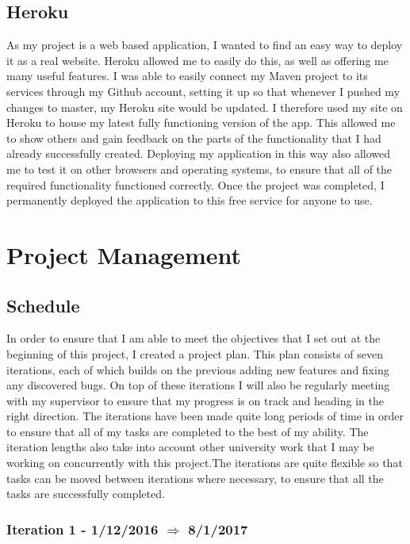 \subsection{Heroku\label{heroku}}
As my project is a web based application, I wanted to find an easy way to deploy it as a real website. Heroku allowed me to easily do this, as well as offering me many useful features. I was able to easily connect my Maven project to its services through my Github account, setting it up so that whenever I pushed my changes to master, my Heroku site would be updated. I therefore used my site on Heroku to house my latest fully functioning version of the app. This allowed me to show others and gain feedback on the parts of the functionality that I had already successfully created. Deploying my application in this way also allowed me to test it on other browsers and operating systems, to ensure that all of the required functionality functioned correctly. Once the project was completed, I permanently deployed the application to this free service for anyone to use.

\pagebreak

\section{Project Management}

\subsection{Schedule \label{schedule}}

In order to ensure that I am able to meet the objectives that I set out at the beginning of this project, I created a project plan. This plan consists of seven iterations, each of which builds on the previous adding new features and fixing any discovered bugs. On top of these iterations I will also be regularly meeting with my supervisor to ensure that my progress is on track and heading in the right direction. The iterations have been made quite long periods of time in order to ensure that all of my tasks are completed to the best of my ability. The iteration lengths also take into account other university work that I may be working on concurrently with this project.The iterations are quite flexible so that tasks can be moved between iterations where necessary, to ensure that all the tasks are successfully completed. 


\subsubsection{Iteration 1 - 1/12/2016 $\Rightarrow$ 8/1/2017}


